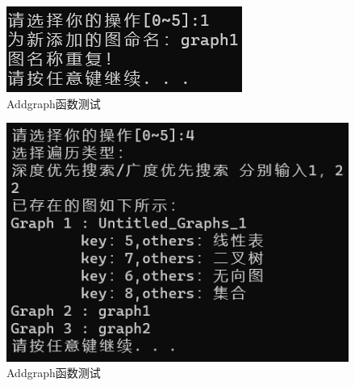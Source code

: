 \documentclass[supercite]{Experimental_Report}
\theoremstyle{definition}
\begin{document}
\begin{enumerate}
\begin{figure}[H]
	\end{figure}
	\begin{figure}[H] %
		\begin{center}
			\includegraphics[width=0.5\linewidth]{images/graph/18-1-3.png}
			\caption{ Addgraph函数测试}
			\label{fig2-16-3}
		\end{center}
	\end{figure}
	\begin{figure}[H] %
		\begin{center}
			\includegraphics[width=0.5\linewidth]{images/graph/18-1-4.png}
			\caption{ Addgraph函数测试}
			\label{fig2-16-4}
		\end{center}
	\end{figure}
	

\end{enumerate}
\end{document}
